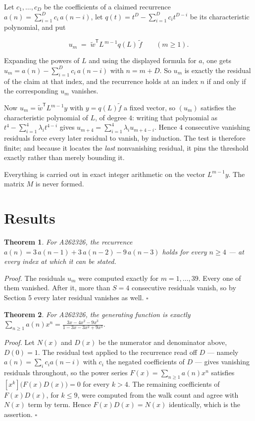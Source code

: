 \documentclass[11pt]{article}
\newtheorem{theorem}{Theorem}
\theoremstyle{definition}
\begin{document}
Let $c_1,\dots,c_D$ be the coefficients of a claimed recurrence $a(n) = \sum_{i=1}^{D} c_i\,a(n-i)$, let $q(t) = t^{D} - \sum_{i=1}^{D} c_i t^{D-i}$ be its characteristic polynomial, and put

\[u_m \;=\; \tilde w^{\mathsf T} L^{\,m-1} q(L)\,\tilde f \qquad (m \ge 1).\]

Expanding the powers of $L$ and using the displayed formula for $a$, one gets $u_m = a(n) - \sum_{i=1}^{D} c_i\,a(n-i)$ with $n = m + D$. So $u_m$ is exactly the residual of the claim at that index, and the recurrence holds at an index $n$ if and only if the corresponding $u_m$ vanishes.

Now $u_m = \tilde w^{\mathsf T} L^{m-1} y$ with $y = q(L)\tilde f$ a fixed vector, so $(u_m)$ satisfies the characteristic polynomial of $L$, of degree $4$: writing that polynomial as $t^{4} - \sum_{i=1}^{4} \lambda_i t^{4-i}$ gives $u_{m+4} = \sum_{i=1}^{4} \lambda_i u_{m+4-i}$. Hence $4$ consecutive vanishing residuals force every later residual to vanish, by induction. The test is therefore finite; and because it locates the {\itshape last} nonvanishing residual, it pins the threshold exactly rather than merely bounding it.

Everything is carried out in exact integer arithmetic on the vector $L^{m-1}y$. The matrix $M$ is never formed.

\section{Results}

\begin{theorem} For A262326, the recurrence $a(n) = 3\,a(n-1) + 3\,a(n-2) - 9\,a(n-3)$ holds for every $n \ge 4$ --- at every index at which it can be stated.\end{theorem}

{\itshape Proof.} The residuals $u_m$ were computed exactly for $m = 1,\dots,39$. Every one of them vanished. After it, more than $S = 4$ consecutive residuals vanish, so by Section 5 every later residual vanishes as well. $\square$

\begin{theorem} For A262326, the generating function is exactly $\sum_{n\ge 1} a(n)x^n = \frac{3x - 4x^{2} - 9x^{3}}{1 - 3x - 3x^{2} + 9x^{3}}$.\end{theorem}

{\itshape Proof.} Let $N(x)$ and $D(x)$ be the numerator and denominator above, $D(0)=1$. The residual test applied to the recurrence read off $D$ --- namely $a(n) = \sum_i c_i a(n-i)$ with $c_i$ the negated coefficients of $D$ --- gives vanishing residuals throughout, so the power series $F(x)=\sum_{n\ge 1}a(n)x^n$ satisfies $[x^k]\bigl(F(x)D(x)\bigr) = 0$ for every $k > 4$. The remaining coefficients of $F(x)D(x)$, for $k \le 9$, were computed from the walk count and agree with $N(x)$ term by term. Hence $F(x)D(x) = N(x)$ identically, which is the assertion. $\square$
\end{document}
